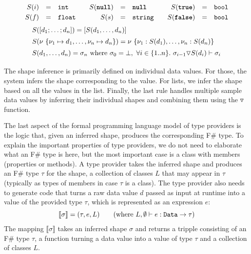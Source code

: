 \documentclass[fleqn,11pt]{report}
\newcommand{\kvd}[1]{\textnormal{\ttfamily\bfseries #1}}
\newcommand{\ident}[1]{\textnormal{\ttfamily #1}}
\theoremstyle{definition}
\newcommand{\sem}[1]{\llbracket #1 \rrbracket}
\newcommand{\semalt}[1]{S(#1)}
\begin{document}
\begin{equation*}
\begin{array}{rclcrclcrcl}
 \semalt{i} &=& \ident{int} && \semalt{\kvd{null}}  &=& \kvd{null} && \semalt{\kvd{true}} &=& \ident{bool}\\[0.3em]
 \semalt{f} &=& \ident{float} && \semalt{s} &=& \ident{string} && \semalt{\kvd{false}}  &=& \ident{bool}\\
\end{array}
\end{equation*}
\noindent
\vspace{-0.6em}
\begin{equation*}
\begin{array}{l}
 \semalt{[d_1; \ldots; d_n]} = [\semalt{d_1, \ldots, d_n}] \\[0.5em]
 \semalt{\nu~\{ \nu_1 \mapsto d_1, \ldots, \nu_n \mapsto d_n \}} = \nu~\{ \nu_1:\semalt{d_1}, \ldots, \nu_n :\semalt{d_n} \} \\[0.5em]
 \semalt{d_1, \ldots, d_n} = \sigma_n ~\textnormal{where}~ \sigma_0 = \bot,~ \forall i\in \{ 1.. n \}.~ \sigma_{i-1} \triangledown \semalt{d_i} \vdash \sigma_i \\[0.6em]
\end{array}
\end{equation*}
%
The shape inference is primarily defined on individual data values. For those, the system infers
the shape corresponding to the value. For lists, we infer the shape based on all the values in
the list. Finally, the last rule handles multiple sample data values by inferring their individual
shapes and combining them using the  $\triangledown$ function.

The last aspect of the formal programming language model of type providers is the logic that,
given an inferred shape, produces the corresponding F\# type. To explain the important
properties of type providers, we do not need to elaborate what an F\# type is here, but the most
important case is a class with members (properties or methods). A type provider takes the inferred
shape and produces an F\# type $\tau$ for the shape, a collection of classes $L$ that may appear
in $\tau$ (typically as types of members in case $\tau$ is a class). The type provider also needs
to generate code that turns a raw data value $d$ passed as input at runtime into a value of the
provided type $\tau$, which is represented as an expression $e$:
%
\begin{equation*}
\sem{\sigma} = (\tau, e, L) \qquad (\textnormal{where}~L,\emptyset \vdash e:\ident{Data}\rightarrow\tau)
\end{equation*}
%
The mapping $\sem{\sigma}$ takes an inferred shape $\sigma$ and returns a tripple consisting of an
F\# type $\tau$, a function turning a data value into a value of type $\tau$ and a collection of
classes $L$.
\end{document}
